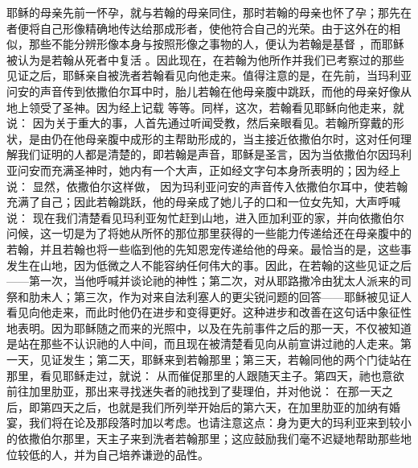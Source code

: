   耶稣的母亲先前一怀孕，就与若翰的母亲同住，那时若翰的母亲也怀了孕；那先在者便将自己形像精确地传达给那成形者，使他符合自己的光荣。由于这外在的相似，那些不能分辨形像本身与按照形像之事物的人，便认为若翰是基督 ，而耶稣被认为是若翰从死者中复活 。因此现在，在若翰为他所作并我们已考察过的那些见证之后，耶稣亲自被洗者若翰看见向他走来。值得注意的是，在先前，当玛利亚问安的声音传到依撒伯尔耳中时，胎儿若翰在他母亲腹中跳跃，而他的母亲好像从地上领受了圣神。因为经上记载   等等。同样，这次，若翰看见耶稣向他走来，就说： 因为关于重大的事，人首先通过听闻受教，然后亲眼看见。若翰所穿戴的形状，是由仍在他母亲腹中成形的主帮助形成的，当主接近依撒伯尔时，这对任何理解我们证明的人都是清楚的，即若翰是声音，耶稣是圣言，因为当依撒伯尔因玛利亚问安而充满圣神时，她内有一个大声，正如经文字句本身所表明的；因为经上说： 显然，依撒伯尔这样做， 因为玛利亚问安的声音传入依撒伯尔耳中，使若翰充满了自己；因此若翰跳跃，他的母亲成了她儿子的口和一位女先知，大声呼喊说： 现在我们清楚看见玛利亚匆忙赶到山地，进入匝加利亚的家，并向依撒伯尔问候，这一切是为了将她从所怀的那位那里获得的一些能力传递给还在母亲腹中的若翰，并且若翰也将一些临到他的先知恩宠传递给他的母亲。最恰当的是，这些事发生在山地，因为低微之人不能容纳任何伟大的事。因此，在若翰的这些见证之后——第一次，当他呼喊并谈论祂的神性；第二次，对从耶路撒冷由犹太人派来的司祭和肋未人；第三次，作为对来自法利塞人的更尖锐问题的回答——耶稣被见证人看见向他走来，而此时他仍在进步和变得更好。这种进步和改善在这句话中象征性地表明。因为耶稣随之而来的光照中，以及在先前事件之后的那一天，不仅被知道是站在那些不认识祂的人中间，而且现在被清楚看见向从前宣讲过祂的人走来。第一天，见证发生；第二天，耶稣来到若翰那里；第三天，若翰同他的两个门徒站在那里，看见耶稣走过，就说： 从而催促那里的人跟随天主子。第四天，祂也意欲前往加里肋亚，那出来寻找迷失者的祂找到了斐理伯，并对他说： 在那一天之后，即第四天之后，也就是我们所列举开始后的第六天，在加里肋亚的加纳有婚宴，我们将在论及那段落时加以考虑。也请注意这点：身为更大的玛利亚来到较小的依撒伯尔那里，天主子来到洗者若翰那里；这应鼓励我们毫不迟疑地帮助那些地位较低的人，并为自己培养谦逊的品性。\par


